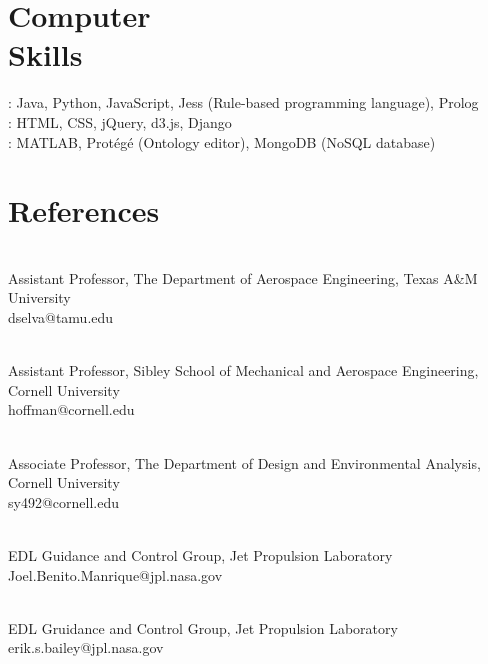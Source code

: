\documentclass[mm]{simple_style}
\begin{document}
\begin{resume}
\vspace{-2ex}
\sectionline

\section{Computer\\Skills}
: Java, Python, JavaScript, Jess (Rule-based programming language), Prolog
\\
: HTML, CSS, jQuery, d3.js, Django
\\
: MATLAB, Prot\'{e}g\'{e} (Ontology editor), MongoDB (NoSQL database)

\vspace{-2ex}
\sectionline

\section{References}
\\
Assistant Professor, The Department of Aerospace Engineering, Texas A\&M University\\
dselva@tamu.edu

\\
Assistant Professor, Sibley School of Mechanical and Aerospace Engineering, Cornell University\\
hoffman@cornell.edu

\\
Associate Professor, The Department of Design and Environmental Analysis, Cornell University\\
sy492@cornell.edu

\\
EDL Guidance and Control Group, Jet Propulsion Laboratory\\
Joel.Benito.Manrique@jpl.nasa.gov

\\
EDL Gruidance and Control Group, Jet Propulsion Laboratory\\
erik.s.bailey@jpl.nasa.gov


\end{resume}
\end{document}

